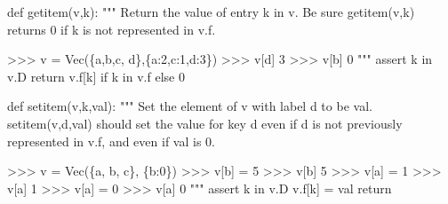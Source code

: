 \documentclass[
  letterpaper,
  DIV=11,
  numbers=noendperiod]{scrartcl}
\newenvironment{Shaded}{\begin{snugshade}}{\end{snugshade}}
\newcommand{\CommentTok}[1]{\textcolor[rgb]{0.37,0.37,0.37}{#1}}
\newcommand{\ControlFlowTok}[1]{\textcolor[rgb]{0.00,0.23,0.31}{#1}}
\newcommand{\DecValTok}[1]{\textcolor[rgb]{0.68,0.00,0.00}{#1}}
\newcommand{\KeywordTok}[1]{\textcolor[rgb]{0.00,0.23,0.31}{#1}}
\newcommand{\NormalTok}[1]{\textcolor[rgb]{0.00,0.23,0.31}{#1}}
\newcommand{\OperatorTok}[1]{\textcolor[rgb]{0.37,0.37,0.37}{#1}}
\begin{document}
\begin{Shaded}
\begin{Highlighting}[numbers=left,,]
\KeywordTok{def}\NormalTok{ getitem(v,k):}
    \CommentTok{"""}
\CommentTok{    Return the value of entry k in v.}
\CommentTok{    Be sure getitem(v,k) returns 0 if k is not represented in v.f.}

\CommentTok{    \textgreater{}\textgreater{}\textgreater{} v = Vec(\{\textquotesingle{}a\textquotesingle{},\textquotesingle{}b\textquotesingle{},\textquotesingle{}c\textquotesingle{}, \textquotesingle{}d\textquotesingle{}\},\{\textquotesingle{}a\textquotesingle{}:2,\textquotesingle{}c\textquotesingle{}:1,\textquotesingle{}d\textquotesingle{}:3\})}
\CommentTok{    \textgreater{}\textgreater{}\textgreater{} v[\textquotesingle{}d\textquotesingle{}]}
\CommentTok{    3}
\CommentTok{    \textgreater{}\textgreater{}\textgreater{} v[\textquotesingle{}b\textquotesingle{}]}
\CommentTok{    0}
\CommentTok{    """}
    \ControlFlowTok{assert}\NormalTok{ k }\KeywordTok{in}\NormalTok{ v.D}
    \ControlFlowTok{return}\NormalTok{ v.f[k] }\ControlFlowTok{if}\NormalTok{ k }\KeywordTok{in}\NormalTok{ v.f }\ControlFlowTok{else} \DecValTok{0}

\KeywordTok{def}\NormalTok{ setitem(v,k,val):}
    \CommentTok{"""}
\CommentTok{    Set the element of v with label d to be val.}
\CommentTok{    setitem(v,d,val) should set the value for key d even if d}
\CommentTok{    is not previously represented in v.f, and even if val is 0.}

\CommentTok{    \textgreater{}\textgreater{}\textgreater{} v = Vec(\{\textquotesingle{}a\textquotesingle{}, \textquotesingle{}b\textquotesingle{}, \textquotesingle{}c\textquotesingle{}\}, \{\textquotesingle{}b\textquotesingle{}:0\})}
\CommentTok{    \textgreater{}\textgreater{}\textgreater{} v[\textquotesingle{}b\textquotesingle{}] = 5}
\CommentTok{    \textgreater{}\textgreater{}\textgreater{} v[\textquotesingle{}b\textquotesingle{}]}
\CommentTok{    5}
\CommentTok{    \textgreater{}\textgreater{}\textgreater{} v[\textquotesingle{}a\textquotesingle{}] = 1}
\CommentTok{    \textgreater{}\textgreater{}\textgreater{} v[\textquotesingle{}a\textquotesingle{}]}
\CommentTok{    1}
\CommentTok{    \textgreater{}\textgreater{}\textgreater{} v[\textquotesingle{}a\textquotesingle{}] = 0}
\CommentTok{    \textgreater{}\textgreater{}\textgreater{} v[\textquotesingle{}a\textquotesingle{}]}
\CommentTok{    0}
\CommentTok{    """}
    \ControlFlowTok{assert}\NormalTok{ k }\KeywordTok{in}\NormalTok{ v.D}
\NormalTok{    v.f[k] }\OperatorTok{=}\NormalTok{ val}
    \ControlFlowTok{return}


\end{Highlighting}
\end{Shaded}
\end{document}
